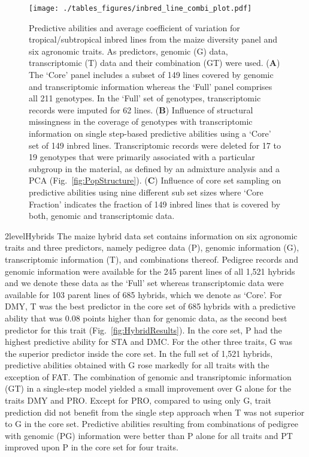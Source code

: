 \documentclass[12pt,titlepage]{article}
\begin{document}
\begin{figure}[H]
  \centering
  \texttt{[image: ./tables\_figures/inbred\_line\_combi\_plot.pdf]}
  \caption{
  Predictive abilities and average coefficient of variation for
  tropical/subtropical inbred lines from the maize diversity panel and six 
  agronomic traits.
  As predictors, genomic (G) data, transcriptomic (T) data and their 
  combination (GT) were used.
  (\textbf{A}) The `Core' panel includes a subset of 149 lines covered by
  genomic and transcriptomic information whereas the `Full' panel comprises all
  211 genotypes. In the `Full' set of genotypes, transcriptomic records were
  imputed for 62 lines.
  (\textbf{B}) Influence of structural missingness in the coverage of genotypes 
  with transcriptomic information on single step-based predictive abilities 
  using a `Core' set of 149 inbred lines.
  Transcriptomic records were deleted for 17 to 19 genotypes that were
  primarily associated with a particular subgroup in the material, as defined
  by an admixture analysis and a PCA (Fig.~\ref{fig:PopStructure}).
  (\textbf{C}) Influence of core set sampling on predictive abilities using
  nine different sub set sizes where `Core Fraction' indicates the fraction
  of 149 inbred lines that is covered by both, genomic and transcriptomic
  data.
  }
\label{fig:InbredResults}
\end{figure}



\Genetics2level{Hybrids}
The maize hybrid data set contains information on six agronomic traits and
three predictors, namely pedigree data (P), genomic information (G), 
transcriptomic information (T), and combinations thereof.
Pedigree records and genomic information were available for the 245 parent 
lines of all 1,521 hybrids and we denote these data as the `Full' set whereas
transcriptomic data were available for 103 parent lines of 685 hybrids, which
we denote as `Core'.
For DMY, T was the best predictor in the core set of 685 hybrids with a 
predictive ability that was 0.08 points higher than for genomic data, as the 
second best predictor for this trait (Fig.~\ref{fig:HybridResults}).
In the core set, P had the highest predictive ability for STA and DMC\@.
For the other three traits, G was the superior predictor inside the core set.
In the full set of 1,521 hybrids, predictive abilities obtained with G rose 
markedly for all traits with the exception of FAT\@.
The combination of genomic and transriptomic information (GT) in a single-step
model yielded a small improvement over G alone for the traits DMY and PRO\@.
Except for PRO, compared to using only G, trait prediction did not benefit from 
the single step approach when T was not superior to G in the core set.
Predictive abilities resulting from combinations of pedigree with genomic (PG)
information were better than P alone for all traits and PT improved upon P in
the core set for four traits.
\end{document}

